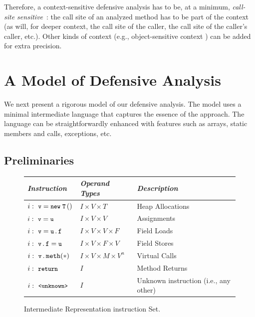 Therefore, a context-sensitive defensive analysis has to be, at a
minimum, \emph{call-site
  sensitive}~\cite{col:1981:Sharir,thesis:Shivers}: the call
site of an analyzed method has to be part of the context (as will, for
deeper context, the call site of the caller, the call site of the
caller's caller, etc.).  Other kinds of context (e.g.,
object-sensitive context \cite{article:2005:Milanova,popl:2011:Smaragdakis}) can be added for extra
precision.


\section{A Model of Defensive Analysis}
\label{sec:model}

We next present a rigorous model of our defensive analysis.  The model
uses a minimal intermediate language that captures the essence of the
approach. The language can be straightforwardly enhanced with
features such as arrays, static members and calls, exceptions, etc. 

\subsection{Preliminaries}

\begin{figure}[t]
  \centering
  \begin{tabular}{l@{\quad}l@{\qquad}l}
    \toprule
    \emph{Instruction}
    & \emph{Operand Types}
    & \emph{Description} \\
    \midrule
    \(\newinstr[i]{v}{T}\)
    & \(I \!\times\! V \!\times\! T\)
    & Heap Allocations
    \\
    \(\moveinstr[i]{v}{u}\)
    & \(I \!\times\! V \!\times\! V\)
    & Assignments
    \\
    \(\fldloadinstr[i]{v}{u}{f}\)
    & \(I \!\times\! V \!\times\! V \!\times\! F\)
    & Field Loads
    \\
    \(\fldstoreinstr[i]{v}{f}{u}\)
    & \(I \!\times\! V \!\times\! F \!\times\! V\)
    & Field Stores
    \\
    \(\vcallinstr[i]{v}{meth}\)
    & \(I \!\times\! V \!\times\! M \!\times\! V^n\)
    & Virtual Calls
    \\
    \(\returninstr[i]{}\)
    & \(I\)
    & Method Returns
    \\
    \(\unknowninstr[i]\)
    & \(I\)
    & Unknown instruction (i.e., any other)
    \\
    \bottomrule
  \end{tabular}
  \caption{%
    Intermediate Representation instruction Set.  %
  }
  \label{fig/javair}
\end{figure}

